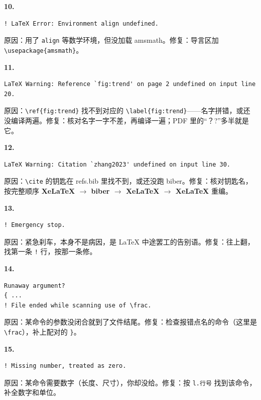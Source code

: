 \textbf{10.}

\begin{lstlisting}
! LaTeX Error: Environment align undefined.
\end{lstlisting}

原因：用了 \texttt{align} 等数学环境，但没加载 amsmath。修复：导言区加 \texttt{\textbackslash{}usepackage\{amsmath\}}。

\textbf{11.}

\begin{lstlisting}
LaTeX Warning: Reference `fig:trend' on page 2 undefined on input line 20.
\end{lstlisting}

原因：\texttt{\textbackslash{}ref\{fig:trend\}} 找不到对应的 \texttt{\textbackslash{}label\{fig:trend\}}——名字拼错，或还没编译两遍。修复：核对名字一字不差，再编译一遍；PDF 里的“？?”多半就是它。

\textbf{12.}

\begin{lstlisting}
LaTeX Warning: Citation `zhang2023' undefined on input line 30.
\end{lstlisting}

原因：\texttt{\textbackslash{}cite} 的钥匙在 refs.bib 里找不到，或还没跑 biber。修复：核对钥匙名，按完整顺序 \textbf{XeLaTeX \ensuremath{\rightarrow} biber \ensuremath{\rightarrow} XeLaTeX \ensuremath{\rightarrow} XeLaTeX} 重编。

\textbf{13.}

\begin{lstlisting}
! Emergency stop.
\end{lstlisting}

原因：紧急刹车，本身不是病因，是 LaTeX 中途罢工的告别语。修复：往上翻，找第一条 \texttt{!} 行，按那一条修。

\textbf{14.}

\begin{lstlisting}
Runaway argument?
{ ...
! File ended while scanning use of \frac.
\end{lstlisting}

原因：某命令的参数没闭合就到了文件结尾。修复：检查报错点名的命令（这里是 \texttt{\textbackslash{}frac}），补上配对的 \texttt{\}}。

\textbf{15.}

\begin{lstlisting}
! Missing number, treated as zero.
\end{lstlisting}

原因：某命令需要数字（长度、尺寸），你却没给。修复：按 \texttt{l.行号} 找到该命令，补全数字和单位。

